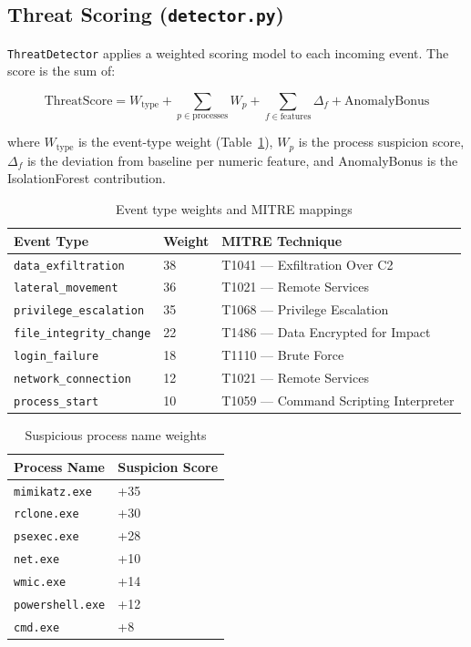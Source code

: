 \documentclass[12pt,a4paper]{article}
\begin{document}
\subsection{Threat Scoring (\texttt{detector.py})}

\texttt{ThreatDetector} applies a weighted scoring model to each incoming event.
The score is the sum of:

\[
\text{ThreatScore} = W_{\text{type}} + \sum_{p \in \text{processes}} W_p
                   + \sum_{f \in \text{features}} \Delta_f + \text{AnomalyBonus}
\]

where $W_{\text{type}}$ is the event-type weight (Table~\ref{tab:event-weights}),
$W_p$ is the process suspicion score, $\Delta_f$ is the deviation from baseline
per numeric feature, and AnomalyBonus is the IsolationForest contribution.

\begin{table}[H]
\centering
\begin{tabular}{lll}
\toprule
\textbf{Event Type} & \textbf{Weight} & \textbf{MITRE Technique} \\
\midrule
\texttt{data\_exfiltration}    & 38 & T1041 — Exfiltration Over C2 \\
\texttt{lateral\_movement}     & 36 & T1021 — Remote Services \\
\texttt{privilege\_escalation} & 35 & T1068 — Privilege Escalation \\
\texttt{file\_integrity\_change} & 22 & T1486 — Data Encrypted for Impact \\
\texttt{login\_failure}        & 18 & T1110 — Brute Force \\
\texttt{network\_connection}   & 12 & T1021 — Remote Services \\
\texttt{process\_start}        & 10 & T1059 — Command Scripting Interpreter \\
\bottomrule
\end{tabular}
\caption{Event type weights and MITRE mappings}
\label{tab:event-weights}
\end{table}

\begin{table}[H]
\centering
\begin{tabular}{ll}
\toprule
\textbf{Process Name} & \textbf{Suspicion Score} \\
\midrule
\texttt{mimikatz.exe}     & +35 \\
\texttt{rclone.exe}       & +30 \\
\texttt{psexec.exe}       & +28 \\
\texttt{net.exe}          & +10 \\
\texttt{wmic.exe}         & +14 \\
\texttt{powershell.exe}   & +12 \\
\texttt{cmd.exe}          & +8 \\
\bottomrule
\end{tabular}
\caption{Suspicious process name weights}
\end{table}
\end{document}
